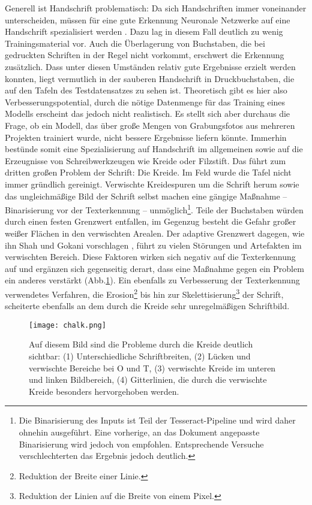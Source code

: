 Generell ist Handschrift problematisch: Da sich Handschriften immer voneinander unterscheiden, müssen für eine gute Erkennung Neuronale Netzwerke auf eine Handschrift spezialisiert werden \cite{sumedhahallale}. Dazu lag in diesem Fall deutlich zu wenig Trainingsmaterial vor. Auch die Überlagerung von Buchstaben, die bei gedruckten Schriften in der Regel nicht vorkommt, erschwert die Erkennung zusätzlich. Dass unter diesen Umständen relativ gute Ergebnisse erzielt werden konnten, liegt vermutlich in der sauberen Handschrift in Druckbuchstaben, die auf den Tafeln des Testdatensatzes zu sehen ist. Theoretisch gibt es hier also Verbesserungspotential, durch die nötige Datenmenge für das Training eines Modells erscheint das jedoch nicht realistisch. Es stellt sich aber durchaus die Frage, ob ein Modell, das über große Mengen von Grabungsfotos aus mehreren Projekten trainiert wurde, nicht bessere Ergebnisse liefern könnte. Immerhin bestünde somit eine Spezialisierung auf Handschrift im allgemeinen sowie auf die Erzeugnisse von Schreibwerkzeugen wie Kreide oder Filzstift.
Das führt zum dritten großen Problem der Schrift: Die Kreide. Im Feld wurde die Tafel nicht immer gründlich gereinigt. Verwischte Kreidespuren um die Schrift herum sowie das ungleichmäßige Bild der Schrift selbst machen eine gängige Maßnahme -- Binarisierung vor der Texterkennung \cite{hamad} \cite{sumedhahallale} -- unmöglich\footnote{Die Binarisierung des Inputs ist Teil der Tesseract-Pipeline und wird daher ohnehin ausgeführt\cite{forsberg}. Eine vorherige, an das Dokument angepasste Binarisierung wird jedoch von empfohlen. Entsprechende Versuche verschlechterten das Ergebnis jedoch deutlich.}. Teile der Buchstaben würden durch einen festen Grenzwert entfallen, im Gegenzug besteht die Gefahr großer weißer Flächen in den verwischten Arealen. Der adaptive Grenzwert dagegen, wie ihn Shah und Gokani vorschlagen \cite{jenilshah}, führt zu vielen Störungen und Artefakten im verwischten Bereich. Diese Faktoren wirken sich negativ auf die Texterkennung auf und ergänzen sich gegenseitig derart, dass eine Maßnahme gegen ein Problem ein anderes verstärkt (Abb.\ref{fig:kreide}).
Ein ebenfalls zu Verbesserung der Texterkennung verwendetes Verfahren, die Erosion\footnote{Reduktion der Breite einer Linie.} bis hin zur Skelettisierung\footnote{Reduktion der Linien auf die Breite von einem Pixel.}\cite{hamad} \cite{sumedhahallale} der Schrift, scheiterte ebenfalls an dem durch die Kreide sehr unregelmäßigen Schriftbild.
\begin{figure}[h!]
\centering
\texttt{[image: chalk.png]}
\caption{Auf diesem Bild sind die Probleme durch die Kreide deutlich sichtbar: (1) Unterschiedliche Schriftbreiten, (2) Lücken und verwischte Bereiche bei O und T, (3) verwischte Kreide im unteren und linken Bildbereich, (4) Gitterlinien, die durch die verwischte Kreide besonders hervorgehoben werden.}
\label{fig:kreide}
\end{figure}
